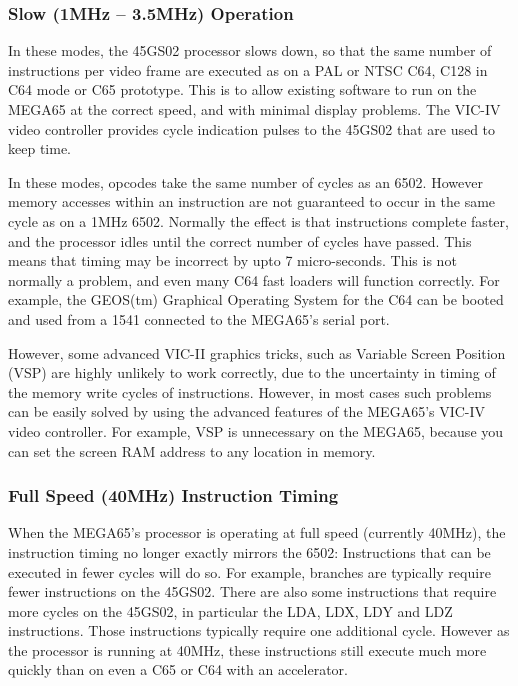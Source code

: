 \subsubsection{Slow (1MHz -- 3.5MHz) Operation}
In these modes, the 45GS02 processor slows down, so that the same number of instructions
per video frame are executed as on a PAL or NTSC C64, C128 in C64 mode or C65 prototype.
This is to allow existing software to run on the MEGA65 at the correct speed, and with
minimal display problems.  The VIC-IV video controller provides cycle indication pulses
to the 45GS02 that are used to keep time.

In these modes, opcodes take the same number of cycles as an 6502.  However memory accesses within an
instruction are not guaranteed to occur in the same cycle as on a 1MHz 6502.  Normally
the effect is that instructions complete faster, and the processor idles until the
correct number of cycles have passed. This means that timing may be incorrect by upto
7 micro-seconds.  This is not normally a problem, and even many C64 fast loaders will
function correctly. For example, the GEOS(tm) Graphical Operating System for the C64
can be booted and used from a 1541 connected to the MEGA65's serial port.

However, some advanced VIC-II graphics tricks, such as Variable Screen Position (VSP) are
highly unlikely to work correctly, due to the uncertainty in timing of the memory write
cycles of instructions.  However, in most cases such problems can be easily solved by using
the advanced features of the MEGA65's VIC-IV video controller.  For example, VSP is unnecessary
on the MEGA65, because you can set the screen RAM address to any location in memory.

\subsubsection{Full Speed (40MHz) Instruction Timing}

When the MEGA65's processor is operating at full speed (currently 40MHz), the instruction
timing no longer exactly mirrors the 6502: Instructions that can be executed in fewer cycles
will do so. For example, branches are typically require fewer instructions on the 45GS02.
There are also some instructions that require more cycles on the 45GS02, in particular the
LDA, LDX, LDY and LDZ instructions. Those instructions typically require one additional cycle.
However as the processor is running at 40MHz, these instructions still execute much more quickly
than on even a C65 or C64 with an accelerator.

